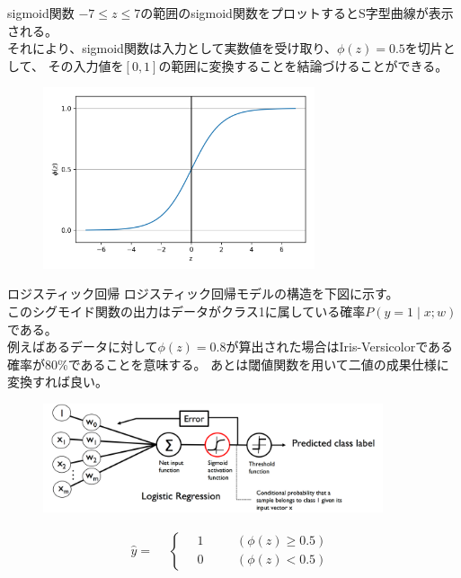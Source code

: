 \documentclass[aspectratio=169, dvipdfmx, 11pt]{beamer} %
\begin{document}
\begin{frame}{sigmoid関数}
    \(-7 \leq z \leq  7\)の範囲のsigmoid関数をプロットするとS字型曲線が表示される。 \\
    それにより、sigmoid関数は入力として実数値を受け取り、\(\phi(z)=0.5\)を切片として、
    その入力値を\([0, 1]\)の範囲に変換することを結論づけることができる。
    \begin{figure}[b]
        \begin{center}
        \includegraphics[width=80mm]{img/day02/fig02.png}
        \end{center}
    \end{figure}
\end{frame}

\begin{frame}{ロジスティック回帰}
    ロジスティック回帰モデルの構造を下図に示す。 \\
    このシグモイド関数の出力はデータがクラス1に属している確率\(P(y=1 \mid x;w)\)である。 \\
    例えばあるデータに対して\(\phi(z)=0.8\)が算出された場合はIris-Versicolorである確率が80\%であることを意味する。
    あとは閾値関数を用いて二値の成果仕様に変換すれば良い。
    \begin{figure}[b]
        \begin{center}
        \includegraphics[width=100mm]{img/day02/fig03.png}
        \end{center}
    \end{figure}
    \begin{equation*}
        \hat{y} = 
        \begin{aligned}
            & \left\{ \,
                \begin{aligned}
                    & 1 & \quad &(\phi(z) \geq 0.5) \\
                    & 0 & \quad &(\phi(z) < 0.5)
                \end{aligned}
            \right.
        \end{aligned}
    \end{equation*}
\end{frame}
\end{document}
